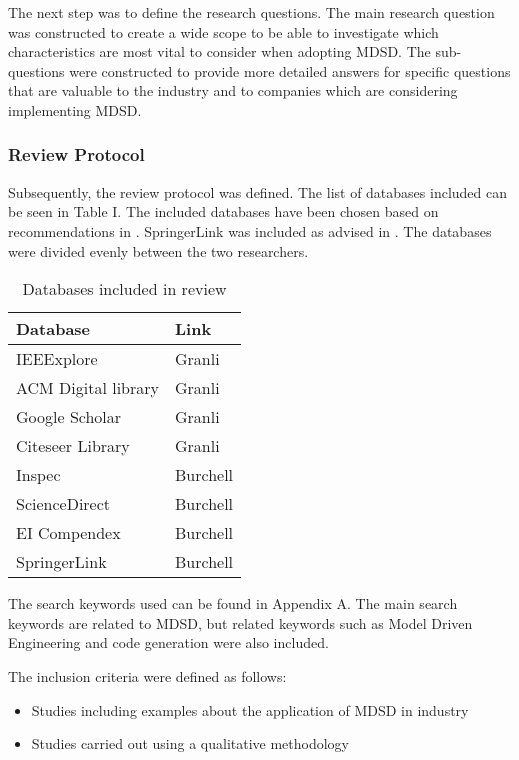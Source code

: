 \documentclass[10pt,twocolumn]{article}
\begin{document}
The next step was to define the research questions. The main research question was constructed to create a wide scope to be able to investigate which characteristics are most vital to consider when adopting MDSD. The sub-questions were constructed to provide more detailed answers for specific questions that are valuable to the industry and to companies which are considering implementing MDSD. 

\subsubsection{Review Protocol}
Subsequently, the review protocol was defined. The list of databases included can be seen in Table I. The included databases have been chosen based on recommendations in \cite{brereton2007lessons}. SpringerLink was included as advised in \cite{kitchenham2007guidelines}. The databases were divided evenly between the two researchers. 

\begin{table}[ht]
	\centering
	\begin{tabular}{|l|l|} 
		\hline
		\textbf{Database} & \textbf{Link}  \\
		\hline
		IEEExplore &  Granli \\
		\hline
		ACM Digital library &  Granli \\
		\hline
		Google Scholar &  Granli \\
		\hline
		Citeseer Library & Granli \\
		\hline
		Inspec &  Burchell \\
		\hline
		ScienceDirect & Burchell \\
		\hline
		EI Compendex &  Burchell \\
		\hline
		SpringerLink & Burchell \\
		\hline
	\end{tabular}
	\caption{Databases included in review}
\end{table}

The search keywords used can be found in Appendix A. The main search keywords are related to MDSD, but related keywords such as Model Driven Engineering and code generation were also included.
\newline

The inclusion criteria were defined as follows: 
\begin{itemize} 
\item Studies including examples about the application of MDSD in industry
\item Studies carried out using a qualitative methodology
\end{itemize}
\end{document}
